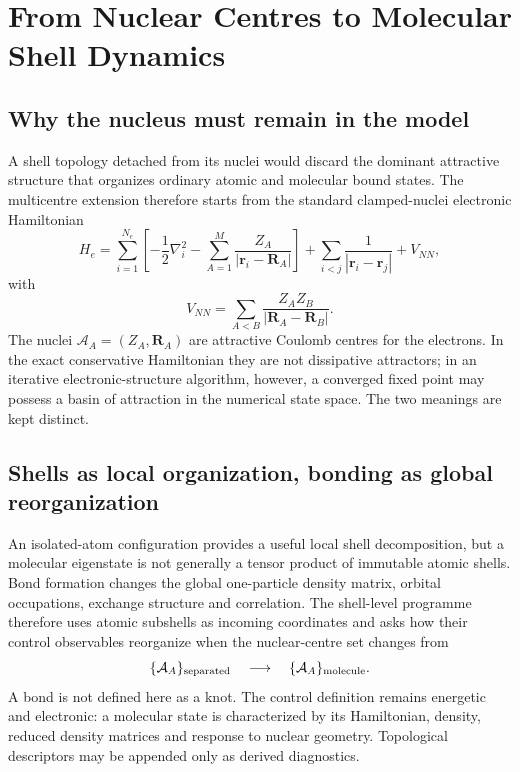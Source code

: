 \chapter{From Nuclear Centres to Molecular Shell Dynamics}
\label{ch:multicentre-shells}

\section{Why the nucleus must remain in the model}
A shell topology detached from its nuclei would discard the dominant attractive structure that organizes ordinary atomic and molecular bound states.  The multicentre extension therefore starts from the standard clamped-nuclei electronic Hamiltonian
\begin{equation}
H_e=\sum_{i=1}^{N_e}\left[-\frac12\nabla_i^2-\sum_{A=1}^{M}\frac{Z_A}{|\mathbf r_i-\mathbf R_A|}\right]
+\sum_{i<j}\frac{1}{|\mathbf r_i-\mathbf r_j|}
+V_{NN},
\end{equation}
with
\begin{equation}
V_{NN}=\sum_{A<B}\frac{Z_A Z_B}{|\mathbf R_A-\mathbf R_B|}.
\end{equation}
The nuclei $\mathcal A_A=(Z_A,\mathbf R_A)$ are attractive Coulomb centres for the electrons.  In the exact conservative Hamiltonian they are not dissipative attractors; in an iterative electronic-structure algorithm, however, a converged fixed point may possess a basin of attraction in the numerical state space.  The two meanings are kept distinct.

\section{Shells as local organization, bonding as global reorganization}
An isolated-atom configuration provides a useful local shell decomposition, but a molecular eigenstate is not generally a tensor product of immutable atomic shells.  Bond formation changes the global one-particle density matrix, orbital occupations, exchange structure and correlation.  The shell-level programme therefore uses atomic subshells as incoming coordinates and asks how their control observables reorganize when the nuclear-centre set changes from
\begin{equation}
\{\mathcal A_A\}_{\rm separated}
\quad\longrightarrow\quad
\{\mathcal A_A\}_{\rm molecule}.
\end{equation}
A bond is not defined here as a knot.  The control definition remains energetic and electronic: a molecular state is characterized by its Hamiltonian, density, reduced density matrices and response to nuclear geometry.  Topological descriptors may be appended only as derived diagnostics.

